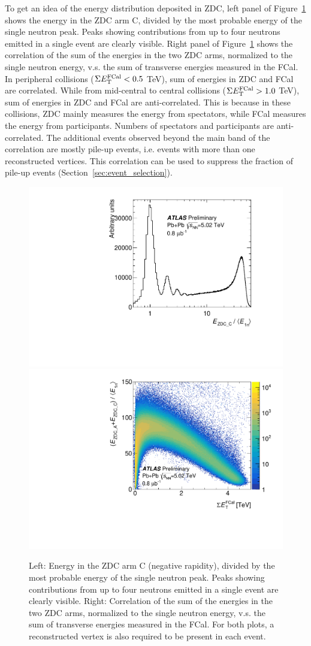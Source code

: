 To get an idea of the energy distribution deposited in ZDC, left panel of Figure~\ref{fig:detector_ATLAS_ZDC_FCal} shows the energy in the ZDC arm C, divided by the most probable energy of the single neutron peak. Peaks showing contributions from up to four neutrons emitted in a single event are clearly visible. Right panel of Figure~\ref{fig:detector_ATLAS_ZDC_FCal} shows the correlation of the sum of the energies in the two ZDC arms, normalized to the single neutron energy, v.s. the sum of transverse energies measured in the FCal. In peripheral collisions ($\Sigma E_\text{T}^\text{FCal}<0.5$ TeV), sum of energies in ZDC and FCal are correlated. While from mid-central to central collisions ($\Sigma E_\text{T}^\text{FCal}>1.0$ TeV), sum of energies in ZDC and FCal are anti-correlated. This is because in these collisions, ZDC mainly measures the energy from spectators, while FCal measures the energy from participants. Numbers of spectators and participants are anti-correlated. The additional events observed beyond the main band of the correlation are mostly pile-up events, i.e. events with more than one reconstructed vertices. This correlation can be used to suppress the fraction of pile-up events (Section~\ref{sec:event_selection}).

\begin{figure}[H]
\centering
\includegraphics[width=.475\linewidth]{figs/chapter_detector/ATLAS_ZDCdis.pdf}
\includegraphics[width=.475\linewidth]{figs/chapter_detector/ATLAS_ZDC_FCal.pdf}
\caption{Left: Energy in the ZDC arm C (negative rapidity), divided by the most probable energy of the single neutron peak. Peaks showing contributions from up to four neutrons emitted in a single event are clearly visible. Right: Correlation of the sum of the energies in the two ZDC arms, normalized to the single neutron energy, v.s. the sum of transverse energies measured in the FCal. For both plots, a reconstructed vertex is also required to be present in each event.}
\label{fig:detector_ATLAS_ZDC_FCal}
\end{figure}



